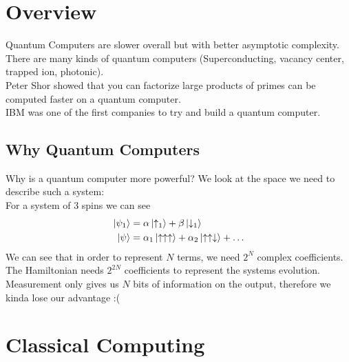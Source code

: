 \section{Overview}
Quantum Computers are slower overall but with better asymptotic complexity. \\
There are many kinds of quantum computers (Superconducting, vacancy center, trapped ion, photonic). \\
Peter Shor showed that you can factorize large products of primes can be computed faster on a quantum computer. \\
IBM was one of the first companies to try and build a quantum computer. \\
\subsection{Why Quantum Computers}
Why is a quantum computer more powerful? We look at the space we need to describe such a system:\\
For a system of 3 spins we can see
\begin{align*}
	\ket{\psi_1} &= \alpha\ket{\uparrow_1} + \beta\ket{\downarrow_1} \\
	\ket{\psi} &= \alpha_1\ket{\uparrow\uparrow\uparrow} + \alpha_2\ket{\uparrow\uparrow\downarrow} + \ldots
\end{align*}
We can see that in order to represent $N$ terms, we need $2^N$ complex coefficients. The Hamiltonian needs $2^{2N}$ coefficients to represent the systems evolution. \\
Measurement only gives us $N$ bits of information on the output, therefore we kinda lose our advantage :(
\section{Classical Computing}
